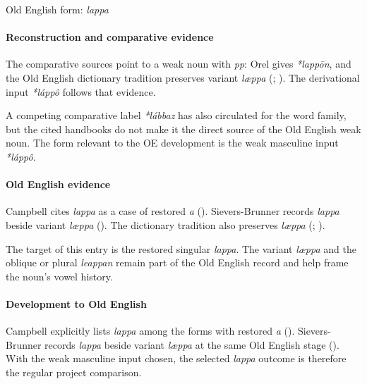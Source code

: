 \documentclass[
  british,
  a4paper,
]{article}
\begin{document}
Old English form: \emph{lappa}

\paragraph{Reconstruction and comparative
evidence}\label{reconstruction-and-comparative-evidence-15}

The comparative sources point to a weak noun with \emph{pp}: Orel gives
\emph{*lappōn}, and the Old English dictionary tradition preserves
variant \emph{læppa} (;
). The derivational
input \emph{*láppô} follows that evidence.

A competing comparative label \emph{*lábbaz} has also circulated for the
word family, but the cited handbooks do not make it the direct source of
the Old English weak noun. The form relevant to the OE development is
the weak masculine input \emph{*láppô}.

\paragraph{Old English evidence}\label{old-english-evidence-15}

Campbell cites \emph{lappa} as a case of restored \emph{a}
(). Sievers-Brunner
records \emph{lappa} beside variant \emph{læppa}
(). The
dictionary tradition also preserves \emph{læppa}
(;
).

The target of this entry is the restored singular \emph{lappa}. The
variant \emph{læppa} and the oblique or plural \emph{leappan} remain
part of the Old English record and help frame the noun's vowel history.

\paragraph{Development to Old
English}\label{development-to-old-english-15}

Campbell explicitly lists \emph{lappa} among the forms with restored
\emph{a} ().
Sievers-Brunner records \emph{lappa} beside variant \emph{læppa} at the
same Old English stage (). With the weak masculine input chosen, the selected
\emph{lappa} outcome is therefore the regular project comparison.
\end{document}
